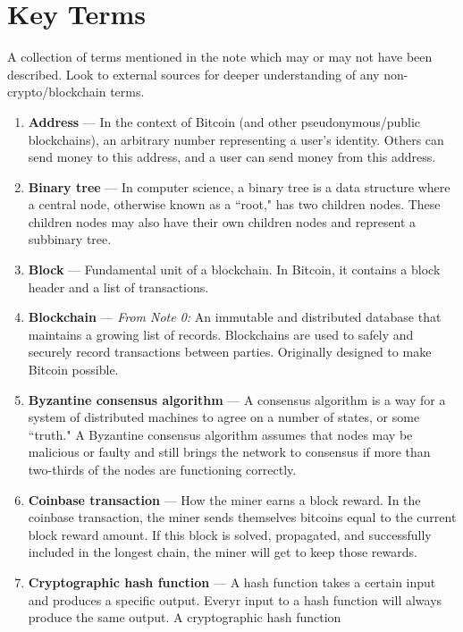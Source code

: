 \documentclass[full.tex]{subfiles}
\begin{document}
    
    
    \newpage
    \thispagestyle{firstpage}
    \vspace*{2\baselineskip}
    \section*{Key Terms}
    \noindent A collection of terms mentioned in the note which may or may not have been described. Look to external sources for deeper understanding of any non-crypto/blockchain terms.
    \begin{enumerate}
        \item \textbf{Address} --- In the context of Bitcoin (and other pseudonymous/public blockchains), an arbitrary number representing a user's identity. Others can send money to this address, and a user can send money from this address.
        \item \textbf{Binary tree} --- In computer science, a binary tree is a data structure where a central node, otherwise known as a ``root," has two children nodes. These children nodes may also have their own children nodes and represent a subbinary tree. 
        \item \textbf{Block} --- Fundamental unit of a blockchain. In Bitcoin, it contains a block header and a list of transactions.
        \item \textbf{Blockchain} --- \textit{From Note 0:} An immutable and distributed database that maintains a growing list of records. Blockchains are used to safely and securely record transactions between parties. Originally designed to make Bitcoin possible.
        \item \textbf{Byzantine consensus algorithm} --- A consensus algorithm is a way for a system of distributed machines to agree on a number of states, or some ``truth." A Byzantine consensus algorithm assumes that nodes may be malicious or faulty and still brings the network to consensus if more than two-thirds of the nodes are functioning correctly.
        \item \textbf{Coinbase transaction} --- How the miner earns a block reward. In the coinbase transaction, the miner sends themselves bitcoins equal to the current block reward amount. If this block is solved, propagated, and successfully included in the longest chain, the miner will get to keep those rewards.
        \item \textbf{Cryptographic hash function} --- A hash function takes a certain input and produces a specific output. Everyr input to a hash function will always produce the same output. A cryptographic hash function

\end{enumerate}
\end{document}
